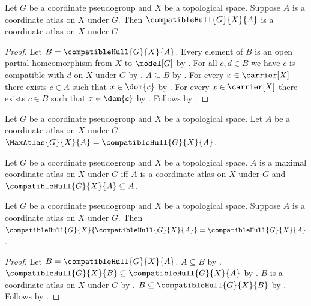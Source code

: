 \begin{theorem}\label{compatible_hull_is_atlas}
    Let $G$ be a coordinate pseudogroup and $X$ be a topological space.
    Suppose $A$ is a coordinate atlas on $X$ under $G$.
    Then $\compatibleHull{G}{X}{A}$ is a coordinate atlas on $X$ under $G$.
\end{theorem}
\begin{proof}
    Let $B=\compatibleHull{G}{X}{A}$.
    Every element of $B$ is an open partial homeomorphism from $X$ to $\model[G]$
        by .
    For all $c,d\in B$ we have $c$ is compatible with $d$ on $X$ under $G$ by
        .
    $A\subseteq B$ by .
    For every $x\in\carrier[X]$ there exists $c\in A$ such that $x\in\dom{c}$ by
        .
    For every $x\in\carrier[X]$ there exists $c\in B$ such that $x\in\dom{c}$ by
        .
    Follows by .
\end{proof}

\begin{definition}\label{max_atlas}
    Let $G$ be a coordinate pseudogroup and $X$ be a topological space.
    Let $A$ be a coordinate atlas on $X$ under $G$.
    $\MaxAtlas{G}{X}{A}=\compatibleHull{G}{X}{A}$.
\end{definition}

\begin{definition}\label{maximal_coordinate_atlas}
    Let $G$ be a coordinate pseudogroup and $X$ be a topological space.
    $A$ is a maximal coordinate atlas on $X$ under $G$ iff
        $A$ is a coordinate atlas on $X$ under $G$ and
        $\compatibleHull{G}{X}{A}\subseteq A$.
\end{definition}

\begin{theorem}\label{compatible_hull_idempotent}
    Let $G$ be a coordinate pseudogroup and $X$ be a topological space.
    Suppose $A$ is a coordinate atlas on $X$ under $G$.
    Then $\compatibleHull{G}{X}{\compatibleHull{G}{X}{A}}=\compatibleHull{G}{X}{A}$.
\end{theorem}
\begin{proof}
    Let $B=\compatibleHull{G}{X}{A}$.
    $A\subseteq B$ by .
    $\compatibleHull{G}{X}{B}\subseteq\compatibleHull{G}{X}{A}$ by
        .
    $B$ is a coordinate atlas on $X$ under $G$ by .
    $B\subseteq\compatibleHull{G}{X}{B}$ by .
    Follows by .
\end{proof}

